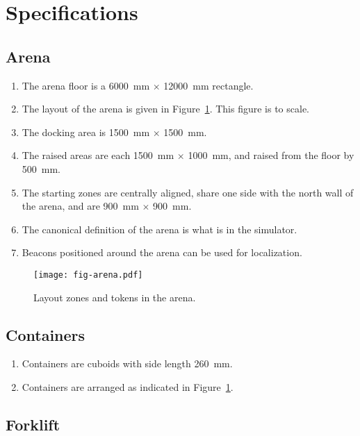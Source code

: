 \section{Specifications}
\label{sec:specs}

\subsection{Arena}
\label{spec:arena}

\begin{enumerate}
  \item The arena floor is a \SI{6000}{mm} $\times$ \SI{12000}{mm} rectangle.
  \item The layout of the arena is given in Figure~\ref{fig:arena}. This
        figure is to scale.
  \item The docking area is \SI{1500}{mm} $\times$ \SI{1500}{mm}.
  \item The raised areas are each \SI{1500}{mm} $\times$ \SI{1000}{mm},
        and raised from the floor by \SI{500}{mm}.
  \item The starting zones are centrally aligned, share one side with the
        north wall of the arena, and are \SI{900}{mm} $\times$ \SI{900}{mm}.
  \item The canonical definition of the arena is what is in the simulator.
  \item Beacons positioned around the arena can be used for localization.
\end{enumerate}

\begin{figure}
  \centering
  \texttt{[image: fig-arena.pdf]}
  \caption{Layout zones and tokens in the arena.}
  \label{fig:arena}
\end{figure}

\subsection{Containers}
\label{spec:containers}

\begin{enumerate}
  \item Containers are cuboids with side length \SI{260}{mm}.
  \item Containers are arranged as indicated in Figure~\ref{fig:arena}.
\end{enumerate}

\subsection{Forklift}
\label{spec:forklift}

